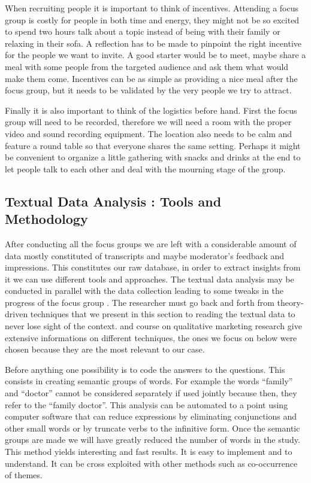 \documentclass[10pt]{report}
\begin{document}
When recruiting people it is important to think of incentives. Attending a focus group is costly for people in both time and energy, they might not be so excited to spend two hours talk about a topic instead of being with their family or relaxing in their sofa. A reflection has to be made to pinpoint the right incentive for the people we want to invite. A good starter would be to meet, maybe share a meal with some people from the targeted audience and ask them what would make them come. Incentives can be as simple as providing a nice meal after the focus group, but it needs to be validated by the very people we try to attract.

Finally it is also important to think of the logistics before hand. First the focus group will need to be recorded, therefore we will need a room with the proper video and sound recording equipment. The location also needs to be calm and feature a round table so that everyone shares the same setting. 
Perhaps it might be convenient to organize a little gathering with snacks and drinks at the end to let people talk to each other and deal with the mourning stage of the group.

\subsection{Textual Data Analysis : Tools and Methodology}

After conducting all the focus groups we are left with a considerable amount of data mostly constituted of transcripts and maybe moderator's feedback and impressions. This constitutes our raw database, in order to extract insights from it we can use different tools and approaches. The textual data analysis may be conducted in parallel with the data collection leading to some tweaks in the progress of the focus group \autocite{pope2000}. The researcher must go back and forth from theory-driven techniques that we present in this section to reading the textual data to never lose sight of the context. \autocite{pope2000} and \autocite{magne2014} course on qualitative marketing research give extensive informations on different techniques, the ones we focus on below were chosen because they are the most relevant to our case.

Before anything one possibility is to code the answers to the questions. This consists in creating semantic groups of words. For example the words \enquote{family} and \enquote{doctor} cannot be considered separately if used jointly because then, they refer to the \enquote{family doctor}. This analysis can be automated to a point using computer software that can reduce expressions by eliminating conjunctions and other small words or by truncate verbs to the infinitive form. Once the semantic groups are made we will have greatly reduced the number of words in the study. This method yields interesting and fast results. It is easy to implement and to understand. It can be cross exploited with other methods such as co-occurrence of themes.
\end{document}
